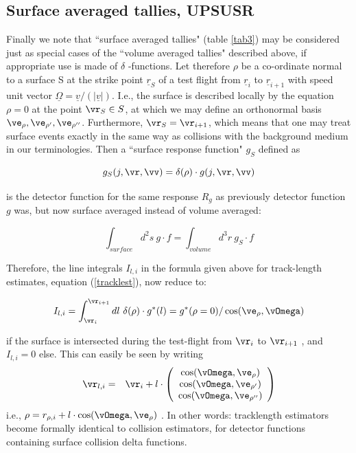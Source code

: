 \subsection{Surface averaged tallies, UPSUSR}\label{sec3.2.4}
\medskip
Finally we note that ``surface averaged tallies" (table \ref{tab3})
may be considered just as special cases of the ``volume averaged
tallies" described above, if appropriate use is made of $\delta$
-functions. Let therefore $\rho$ be a co-ordinate normal to a
surface S at the strike point $\underline{r}_S $ of a test flight
from $\underline{r}_i$ to $\underline{r}_{i+1}$ with speed unit
vector $\underline{\Omega} = \underline{v}  / (| \underline{v} |)$.
I.e., the surface is described locally by the equation $\rho=0$ at
the point $\vr_S \in S$, at which we may define an orthonormal basis
$ \ve_{\rho}, \ve_ {\rho'} , \ve_{\rho''}$. Furthermore, $\vr_S =
\vr_{i+1} $, which means that one may treat surface events exactly
in the same way as collisions with the background medium in our
terminologies. Then a ``surface response function" $ g_S $ defined
as

\[
g_S (j, \vr , \vv )   =
\delta(\rho)  \cdot  g(j, \vr , \vv )
\]

is the detector function for the same response $ R_g $ as previously
detector function $g$ was, but now surface averaged instead of
volume averaged:

\[
\int_{surface}   d^2 s  \ g  \cdot    f    =
\int_{volume}  d^3 r \
g_S   \cdot   f
\]

Therefore, the line integrals $ I_{l,i} $ in the formula given above
for track-length estimates, equation (\ref{tracklest}), now reduce
to:

\begin{equation}
I_{l,i}   =
\int_{ \vr_i}^{\vr_{i+1}}
dl \  \delta(\rho)  \cdot  g^{*} (l)   =
g^{*} (\rho=0)  /  \cos( \ve_{\rho}, \vOmega )
\end{equation}

if the surface is intersected
during the test-flight from $ \vr_i $
to $ \vr_{i+1} $ , and $ I_{l,i} = 0 $ else.
This can easily be seen by writing
\begin{eqnarray}
 \vr_{l,i} & = & \vr_i + l  \cdot
 \left(\begin{array} {c} \cos(\vOmega ,
\ve_{\rho}
)
\\  \cos(\vOmega , \ve_{ \rho '} )
\\  \cos(\vOmega,\ve_{ \rho ''}) \end{array}\right)
\end{eqnarray}
i.e., $ \rho= r_{\rho , i} + l  \cdot  \cos( \vOmega , \ve_{\rho} )
$ . In other words: tracklength estimators become formally identical
to collision estimators, for detector functions containing surface
collision delta functions.




